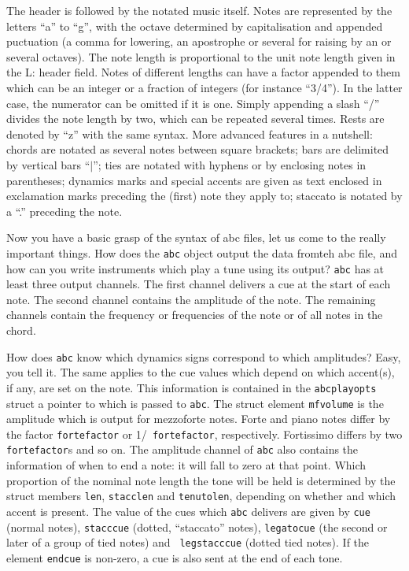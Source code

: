 \documentclass{article}
\begin{document}
The header is followed by the notated music itself.  Notes are represented by
the letters ``a'' to ``g'', with the octave determined by capitalisation and
appended puctuation (a comma for lowering, an apostrophe or several for raising
by an or several octaves).  The note length is proportional to the unit note
length given in the L: header field.  Notes of different lengths can have a
factor appended to them which can be an integer or a fraction of integers (for
instance ``3/4'').  In the latter case, the numerator can be omitted if it is
one.  Simply appending a slash ``/'' divides the note length by two, which can
be repeated several times.  Rests are denoted by ``z'' with the same syntax.
More advanced features in a nutshell: chords are notated as several notes
between square brackets; bars are delimited by vertical bars ``$|$''; ties are
notated with hyphens or by enclosing notes in parentheses; dynamics marks and
special accents are given as text enclosed in exclamation marks preceding the
(first) note they apply to; staccato is notated by a ``.'' preceding the note.

Now you have a basic grasp of the syntax of abc files, let us come to the
really important things.  How does the {\tt abc} object output the data fromteh
abc file, and how can you write instruments which play a tune using its output?
{\tt abc} has at least three output channels.  The first channel delivers a cue
at the start of each note.  The second channel contains the amplitude of the
note.  The remaining channels contain the frequency or frequencies of the note
or of all notes in the chord.

How does {\tt abc} know which dynamics signs correspond to which amplitudes?
Easy, you tell it.  The same applies to the cue values which depend on which
accent(s), if any, are set on the note.  This information is contained in the
{\tt abcplayopts} struct a pointer to which is passed to {\tt abc}.  The struct
element {\tt mfvolume} is the amplitude which is output for mezzoforte notes.
Forte and piano notes differ by the factor {\tt fortefactor} or 1/{\tt
fortefactor}, respectively.  Fortissimo differs by two {\tt fortefactor}s and
so on.  The amplitude channel of {\tt abc} also contains the information
of when to end a note: it will fall to zero at that point.  Which proportion of
the nominal note length the tone will be held is determined by the struct
members {\tt len}, {\tt stacclen} and {\tt tenutolen}, depending on whether and
which accent is present.  The value of the cues which {\tt abc} delivers are
given by {\tt cue} (normal notes), {\tt stacccue} (dotted, ``staccato'' notes),
{\tt legatocue} (the second or later of a group of tied notes) and {\tt
legstacccue} (dotted tied notes).  If the element {\tt endcue} is non-zero, a
cue is also sent at the end of each tone.
\end{document}
